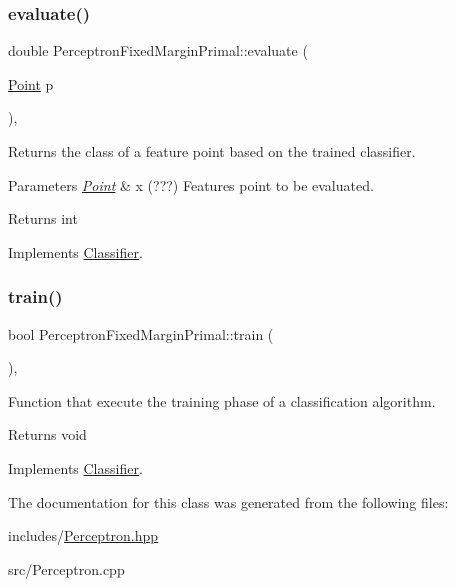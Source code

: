 \subsubsection{\texorpdfstring{evaluate()}{evaluate()}}
{\footnotesize\ttfamily double Perceptron\+Fixed\+Margin\+Primal\+::evaluate (\begin{DoxyParamCaption}\item[{\hyperlink{class_point}{Point}}]{p }\end{DoxyParamCaption})\hspace{0.3cm}{\ttfamily [override]}, {\ttfamily [virtual]}}



Returns the class of a feature point based on the trained classifier. 


\begin{DoxyParams}{Parameters}
{\em \hyperlink{class_point}{Point}} & x (???) Features point to be evaluated. \\
\hline
\end{DoxyParams}
\begin{DoxyReturn}{Returns}
int 
\end{DoxyReturn}


Implements \hyperlink{class_classifier_ae8e9554823b85ddc2dcad2955da811d9}{Classifier}.

\mbox{\label{class_perceptron_fixed_margin_primal_ad013cf0293dd8cda3ac751216b5a7f89}} 
\subsubsection{\texorpdfstring{train()}{train()}}
{\footnotesize\ttfamily bool Perceptron\+Fixed\+Margin\+Primal\+::train (\begin{DoxyParamCaption}{ }\end{DoxyParamCaption})\hspace{0.3cm}{\ttfamily [override]}, {\ttfamily [virtual]}}



Function that execute the training phase of a classification algorithm. 

\begin{DoxyReturn}{Returns}
void 
\end{DoxyReturn}


Implements \hyperlink{class_classifier_a2306a5de27555ab093593ac9642bc7d9}{Classifier}.



The documentation for this class was generated from the following files\+:\begin{DoxyCompactItemize}
\item 
includes/\hyperlink{_perceptron_8hpp}{Perceptron.\+hpp}\item 
src/Perceptron.\+cpp\end{DoxyCompactItemize}
